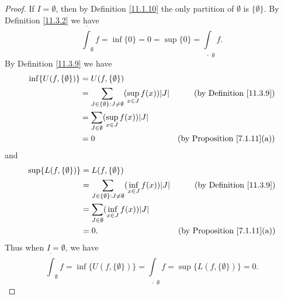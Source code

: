 \begin{proof}
    If \(I = \emptyset\), then by Definition \ref{11.1.10} the only partition of \(\emptyset\) is \(\{\emptyset\}\).
    By Definition \ref{11.3.2} we have
    \[
        \overline{\int}_{\emptyset} f = \inf \{0\} = 0 = \sup \{0\} = \underline{\int}_{\emptyset} f.
    \]
    By Definition \ref{11.3.9} we have
    \begin{align*}
        \inf \{U(f, \{\emptyset\})\} & = U(f, \{\emptyset\}) \\
        & = \sum_{J \in \{\emptyset\} : J \neq \emptyset} (\sup_{x \in J} f(x)) \abs*{J} & \text{(by Definition \ref{11.3.9})} \\
        & = \sum_{J \in \emptyset} (\sup_{x \in J} f(x)) \abs*{J} \\
        & = 0 & \text{(by Proposition \ref{7.1.11}(a))}
    \end{align*}
    and
    \begin{align*}
        \sup \{L(f, \{\emptyset\})\} & = L(f, \{\emptyset\}) \\
        & = \sum_{J \in \{\emptyset\} : J \neq \emptyset} (\inf_{x \in J} f(x)) \abs*{J} & \text{(by Definition \ref{11.3.9})} \\
        & = \sum_{J \in \emptyset} (\inf_{x \in J} f(x)) \abs*{J} \\
        & = 0. & \text{(by Proposition \ref{7.1.11}(a))}
    \end{align*}
    Thus when \(I = \emptyset\), we have
    \[
        \overline{\int}_{\emptyset} f = \inf \{U(f, \{\emptyset\})\} = \underline{\int}_{\emptyset} f = \sup \{L(f, \{\emptyset\})\} = 0.
    \]


\end{proof}

